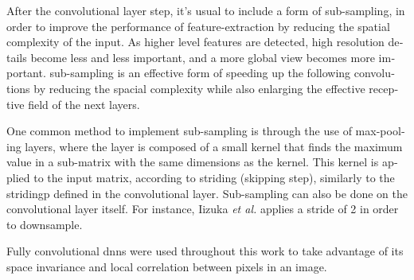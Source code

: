 \documentclass[12pt,openright,oneside,a4paper,english]{abntex2}
\begin{document}
\begin{otherlanguage}{english}
    After the convolutional layer step, it's usual to include a form of sub-sampling, in order to improve the performance of feature-extraction by reducing the spatial complexity of the input. As higher level features are detected, high resolution details become less and less important, and a more global view becomes more important. sub-sampling is an effective form of speeding up the following convolutions by reducing the spacial complexity while also enlarging the effective receptive field of the next layers.

    One common method to implement sub-sampling is through the use of max-pooling layers,
    where the layer is composed of a small kernel that finds the maximum value in a sub-matrix with the same dimensions as the kernel. This kernel is applied to the input matrix, according to striding (skipping step), similarly to the stridingp defined in the convolutional layer. Sub-sampling can also be done on the convolutional layer itself. For instance, Iizuka \textit{et al.} \cite{Iizuka2016} applies a stride of 2 in order to downsample.


    Fully convolutional \acrshort{dnn}s were used throughout this work to take advantage of its space invariance and local correlation between pixels in an image.


\end{otherlanguage}
\end{document}
